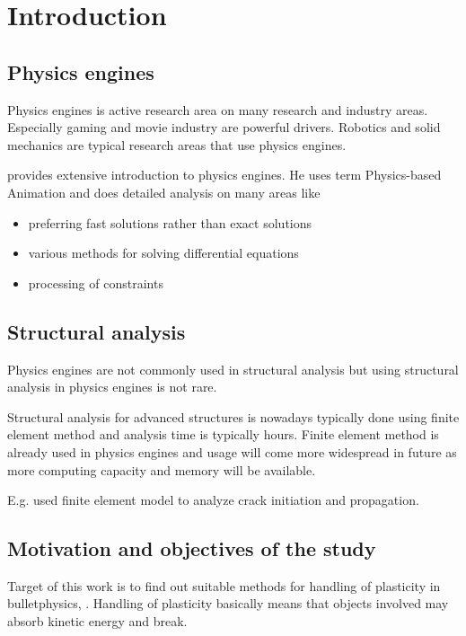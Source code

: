 \section{Introduction}



\subsection{Physics engines}

Physics engines is active research area on many research and industry areas.
Especially gaming and movie industry are powerful drivers.
Robotics and solid mechanics are typical research areas that use physics engines.

\cite{erleben.thesis} provides extensive introduction to physics engines. 
He uses term Physics-based Animation and does detailed analysis on many areas like
\begin{itemize}
\item preferring fast solutions rather than exact solutions
\item various methods for solving differential equations
\item processing of constraints
\end{itemize}

\subsection{Structural analysis}

Physics engines are not commonly used in structural analysis but using structural analysis in physics engines is not rare.  

Structural analysis for advanced structures is nowadays typically done using finite element method and 
analysis time is typically hours. Finite element method is already used in physics engines and usage will come 
more widespread in future as more computing capacity and memory will be available.

E.g. \cite{Obrien:1999:GMA} used finite element model to analyze crack initiation and propagation.

\subsection{Motivation and objectives of the study}

Target of this work is to find out suitable methods for handling of plasticity in bulletphysics, \cite{bulletphysics}. 
Handling of plasticity basically means that objects involved may absorb kinetic energy and break. 

